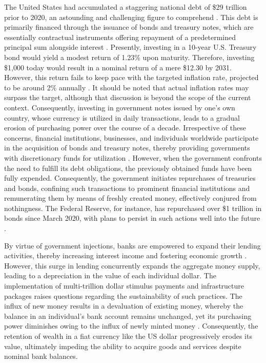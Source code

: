 The United States had accumulated a staggering national debt of \$29 trillion prior to 2020, an astounding and challenging figure to comprehend \cite{usdebt}. This debt is primarily financed through the issuance of bonds and treasury notes, which are essentially contractual instruments offering repayment of a predetermined principal sum alongside interest \cite{treasurysecurities}. Presently, investing in a 10-year U.S. Treasury bond would yield a modest return of 1.23\% upon maturity. Therefore, investing \$1,000 today would result in a nominal return of a mere \$12.30 by 2031. However, this return fails to keep pace with the targeted inflation rate, projected to be around 2\% annually \cite{frbinflation}. It should be noted that actual inflation rates may surpass the target, although that discussion is beyond the scope of the current context. Consequently, investing in government notes issued by one's own country, whose currency is utilized in daily transactions, leads to a gradual erosion of purchasing power over the course of a decade. Irrespective of these concerns, financial institutions, businesses, and individuals worldwide participate in the acquisition of bonds and treasury notes, thereby providing governments with discretionary funds for utilization \cite{treasurysecurities}. However, when the government confronts the need to fulfill its debt obligations, the previously obtained funds have been fully expended. Consequently, the government initiates repurchases of treasuries and bonds, confining such transactions to prominent financial institutions and remunerating them by means of freshly created money, effectively conjured from nothingness. The Federal Reserve, for instance, has repurchased over \$1 trillion in bonds since March 2020, with plans to persist in such actions well into the future \cite{federalreserve}.

By virtue of government injections, banks are empowered to expand their lending activities, thereby increasing interest income and fostering economic growth \cite{federalreserve}. However, this surge in lending concurrently expands the aggregate money supply, leading to a depreciation in the value of each individual dollar. The implementation of multi-trillion dollar stimulus payments and infrastructure packages raises questions regarding the sustainability of such practices. The influx of new money results in a devaluation of existing money, whereby the balance in an individual's bank account remains unchanged, yet its purchasing power diminishes owing to the influx of newly minted money \cite{currencydevaluation}. Consequently, the retention of wealth in a fiat currency like the US dollar progressively erodes its value, ultimately impeding the ability to acquire goods and services despite nominal bank balances.

